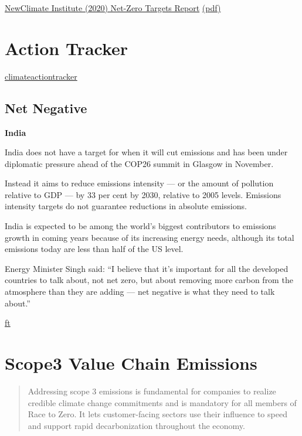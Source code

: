 \documentclass[
]{book}
\begin{document}
\href{https://newclimate.org/2020/10/22/navigating-the-nuances-of-net-zero-targets/}{NewClimate Institute (2020) Net-Zero Targets Report}
\href{pdf/NewClimate_NetZeroReport_October2020.pdf}{(pdf)}

\hypertarget{action-tracker}{%
\section{Action Tracker}\label{action-tracker}}

\href{https://climateactiontracker.org/}{climateactiontracker}

\hypertarget{net-negative-1}{%
\subsection{Net Negative}\label{net-negative-1}}

\textbf{India}

India does not have a target for when it will cut emissions and has been under diplomatic pressure ahead of the COP26 summit in Glasgow in November.

Instead it aims to reduce emissions intensity --- or the amount of pollution relative to GDP --- by 33 per cent by 2030, relative to 2005 levels. Emissions intensity targets do not guarantee reductions in absolute emissions.

India is expected to be among the world's biggest contributors to emissions growth in coming years because of its increasing energy needs, although its total emissions today are less than half of the US level.

Energy Minister Singh said: ``I believe that it's important for all the developed countries to talk about, not net zero, but about removing more carbon from the atmosphere than they are adding --- net negative is what they need to talk about.''

\href{https://www.ft.com/content/b45113f8-5b5b-4f3e-a450-0a2b100595f6?shareType=nongift}{ft}

\hypertarget{scope3-value-chain-emissions}{%
\section{Scope3 Value Chain Emissions}\label{scope3-value-chain-emissions}}

\begin{quote}
Addressing scope 3 emissions is fundamental for companies to realize credible climate change commitments and is mandatory for all members of Race to Zero. It lets customer-facing sectors use their influence to speed and support rapid decarbonization throughout the economy.
\end{quote}
\end{document}
